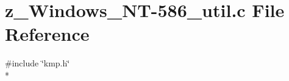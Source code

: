 \hypertarget{z__Windows__NT-586__util_8c}{\section{z\-\_\-\-Windows\-\_\-\-N\-T-\/586\-\_\-util.c File Reference}
\label{z__Windows__NT-586__util_8c}
}
{\ttfamily \#include \char`\"{}kmp.\-h\char`\"{}}\\*
